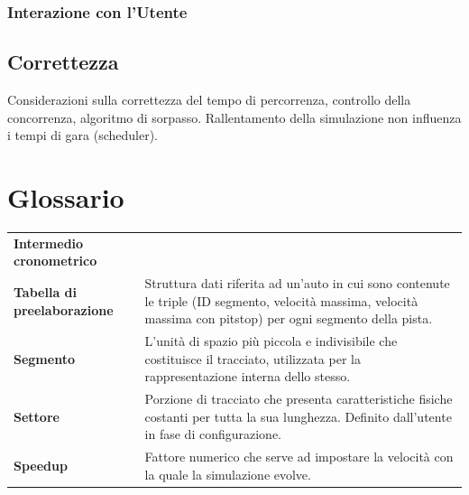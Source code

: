 \documentclass[11pt,a4paper]{report}
\newcommand{\term}[2]{\textbf{#1} & #2 \\}
\begin{document}
\subsection{Interazione con l'Utente}

\section{Correttezza}
Considerazioni sulla correttezza del tempo di percorrenza, controllo della concorrenza, algoritmo di sorpasso.
Rallentamento della simulazione non influenza i tempi di gara (scheduler).
\appendix

\chapter{Glossario}

\begin{tabularx}{\textwidth}{lX}
\term{Intermedio cronometrico}{}
\term{Tabella di preelaborazione}{Struttura dati riferita ad un'auto in cui sono contenute le triple (ID segmento, velocità massima, velocità massima con pitstop) per ogni segmento della pista.}
\term{Segmento}{L'unità di spazio più piccola e indivisibile che costituisce il tracciato, utilizzata per la rappresentazione interna dello stesso.}
\term{Settore}{Porzione di tracciato che presenta caratteristiche fisiche costanti per tutta la sua lunghezza. Definito dall'utente in fase di configurazione.}
\term{Speedup}{Fattore numerico che serve ad impostare la velocità con la quale la simulazione evolve.}
\end{tabularx}
\end{document}
